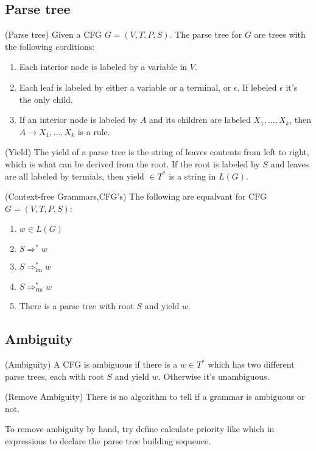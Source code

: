         \subsection{Parse tree}
        \begin{definition}
            (Parse tree) Given a CFG $G=(V,T,P,S)$. The parse tree for $G$ are trees with the following corditions:
            \begin{enumerate}
                \item Each interior node is labeled by a variable in $V$.
                \item Each leaf is labeled by either a variable or a terminal, or $\epsilon$. If lebeled $\epsilon$ it's the only child.
                \item If an interior node is labeled by $A$ and its children are labeled $X_1,\ldots,X_{k}$, then $A\rightarrow X_1,\ldots,X_{k}$ is a rule.
            \end{enumerate}
        \end{definition}
        \begin{definition}
            (Yield) The yield of a parse tree is the string of leaves contents from left to right, which is what can be derived from the root. If the root is labeled by $S$ and leaves are all labeled by termials, then yield $\in T^{*}$ is a string in $L(G)$.
        \end{definition}
        
        \begin{theorem}
            \label{theorem:Context-free Grammars,CFG's}
            (Context-free Grammars,CFG's) The following are equalvant for CFG $G=(V,T,P,S)$:
            \begin{enumerate}
                \item $w\in L(G)$
                \item $S\Rightarrow ^{*}w$ 
                \item $S\Rightarrow ^{*}_{\mathrm{lm}}w$ 
                \item $S\Rightarrow ^{*}_{\mathrm{r m}}w$ 
                \item There is a parse tree with root $S$ and yield $w$.
            \end{enumerate}
        \end{theorem}
        \subsection{Ambiguity}
        \begin{definition}
            (Ambiguity) A CFG is ambiguous if there is a $w\in T^{*}$ which has two different parse trees, each with root $S$ and yield $w$. Otherwise it's unambiguous.
        \end{definition}
        \begin{remark}
            (Remove Ambiguity) There is no algorithm to tell if a grammar is ambiguous or not.

            To remove ambiguity by hand, try define calculate priority like which in expressions to declare the parse tree building sequence.
        \end{remark}
